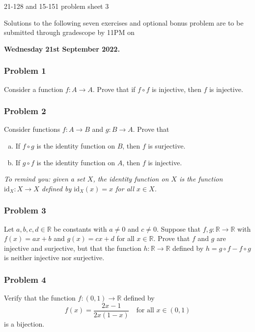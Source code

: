\newpage\documentclass[11pt,onecolumn,fleqn]{article}
\theoremstyle{definition}
\begin{document}
\thispagestyle{empty}
\begin{center}
{\Huge
21-128 and 15-151 problem sheet 3
}

Solutions to the following seven exercises and optional bonus problem are to be submitted through 
gradescope by 11PM on

\textbf{Wednesday 21st September 2022.}

\end{center}


\subsubsection*{Problem 1}
Consider a function $f : A \to A$. Prove that if $f \circ f$ is injective, then $f$ is injective.


\subsubsection*{Problem 2}
Consider functions $f : A \to B$ and $g : B \to A$. Prove that
\begin{enumerate}[(a)]
\item If $f \circ g$ is the identity function on $B$, then $f$ is surjective.
\item If $g \circ f$ is the identity function on $A$, then $f$ is injective.
\end{enumerate}

\textit{To remind you: given a set $X$, the identity function on $X$ is the function $\mathrm{id}_X : X \to X$ 
defined by $\mathrm{id}_X(x)=x$ for all $x \in X$.}

\subsubsection*{Problem 3}
Let $a,b,c,d \in \mathbb{R}$ be constants with $a \ne 0$ and $c \ne 0$. Suppose that $f,g : \mathbb{R} \to \mathbb{R}$ with 
$f(x)=ax+b$ and $g(x)=cx+d$ for all $x \in \mathbb{R}$. Prove that $f$ and $g$ are injective and surjective, but that the 
function $h : \mathbb{R} \to \mathbb{R}$ defined by $h = g \circ f - f \circ g$ is neither injective nor surjective.

\subsubsection*{Problem 4}
Verify that the function $f : (0,1) \to \mathbb{R}$ defined by
$$f(x) = \frac{2x-1}{2x(1-x)} \quad \text{for all } x \in (0,1)$$
is a bijection.
\end{document}
